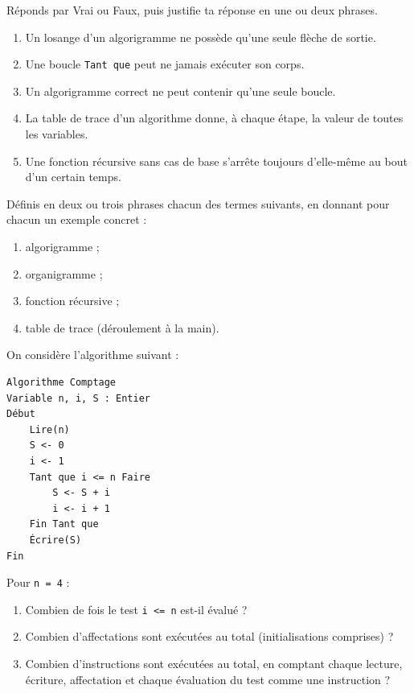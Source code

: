 \documentclass[11pt]{article}
\begin{document}
\begin{exercice}
Réponds par Vrai ou Faux, puis justifie ta réponse en une ou deux phrases.
\begin{enumerate}
\item Un losange d'un algorigramme ne possède qu'une seule flèche de sortie.
\item Une boucle \texttt{Tant que} peut ne jamais exécuter son corps.
\item Un algorigramme correct ne peut contenir qu'une seule boucle.
\item La table de trace d'un algorithme donne, à chaque étape, la valeur de toutes les variables.
\item Une fonction récursive sans cas de base s'arrête toujours d'elle-même au bout d'un certain temps.
\end{enumerate}
\end{exercice}

\begin{exercice}[Définitions]
Définis en deux ou trois phrases chacun des termes suivants, en donnant pour chacun un exemple concret :
\begin{enumerate}
\item algorigramme ;
\item organigramme ;
\item fonction récursive ;
\item table de trace (déroulement à la main).
\end{enumerate}
\end{exercice}

\begin{exercice}
On considère l'algorithme suivant :
\begin{lstlisting}
Algorithme Comptage
Variable n, i, S : Entier
Début
    Lire(n)
    S <- 0
    i <- 1
    Tant que i <= n Faire
        S <- S + i
        i <- i + 1
    Fin Tant que
    Écrire(S)
Fin
\end{lstlisting}
Pour \texttt{n = 4} :
\begin{enumerate}
\item Combien de fois le test \texttt{i <= n} est-il évalué ?
\item Combien d'affectations sont exécutées au total (initialisations comprises) ?
\item Combien d'instructions sont exécutées au total, en comptant chaque lecture, écriture, affectation et chaque évaluation du test comme une instruction ?
\end{enumerate}
\end{exercice}
\end{document}
